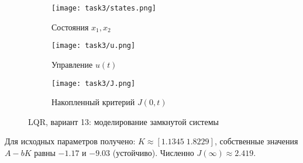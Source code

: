 \begin{figure}[H]
    \centering
    \begin{subfigure}{0.48\textwidth}
        \texttt{[image: task3/states.png]}
        \caption{Состояния $x_1, x_2$}
    \end{subfigure}\hfill
    \begin{subfigure}{0.48\textwidth}
        \texttt{[image: task3/u.png]}
        \caption{Управление $u(t)$}
    \end{subfigure}

    \vspace{0.5em}

    \begin{subfigure}{0.48\textwidth}
        \texttt{[image: task3/J.png]}
        \caption{Накопленный критерий $J(0,t)$}
    \end{subfigure}
    \caption{LQR, вариант 13: моделирование замкнутой системы}
    \label{fig:l3:lqr}
\end{figure}

Для исходных параметров получено: \(K\approx[1.1345\; 1.8229]\), собственные значения \(A-bK\) равны \(-1.17\) и \(-9.03\) (устойчиво). Численно \(J(\infty)\approx 2.419\).
